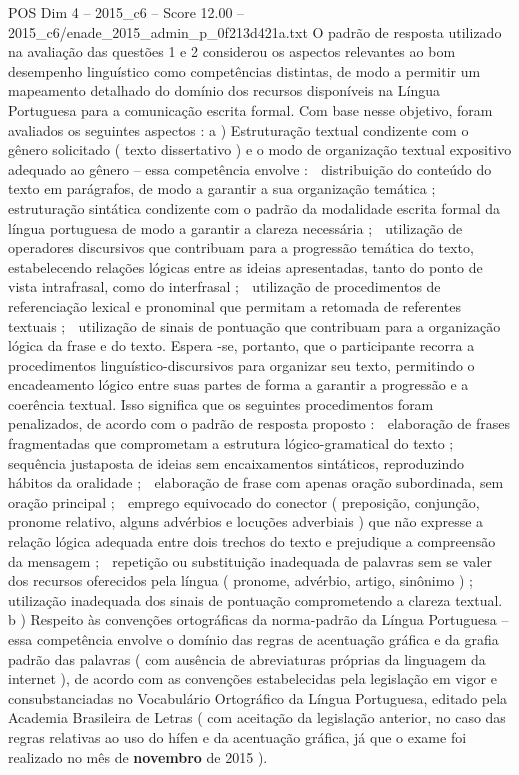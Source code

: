 \begin{textsample}{POS Dim 4 – 2015\_c6 – Score 12.00 – 2015\_c6/enade\_2015\_admin\_p\_0f213d421a.txt}
O padrão de resposta utilizado na avaliação das questões 1 e 2 considerou os aspectos relevantes ao bom desempenho linguístico como competências distintas, de modo a permitir um mapeamento detalhado do domínio dos recursos disponíveis na Língua Portuguesa para a comunicação escrita formal.
Com base nesse objetivo, foram avaliados os seguintes aspectos : a ) Estruturação textual condizente com o gênero solicitado ( texto dissertativo ) e o modo de organização textual expositivo adequado ao gênero – essa competência envolve :  distribuição do conteúdo do texto em parágrafos, de modo a garantir a sua organização temática ;  estruturação sintática condizente com o padrão da modalidade escrita formal da língua portuguesa de modo a garantir a clareza necessária ;  utilização de operadores discursivos que contribuam para a progressão temática do texto, estabelecendo relações lógicas entre as ideias apresentadas, tanto do ponto de vista intrafrasal, como do interfrasal ;  utilização de procedimentos de referenciação lexical e pronominal que permitam a retomada de referentes textuais ;  utilização de sinais de pontuação que contribuam para a organização lógica da frase e do texto.
Espera -se, portanto, que o participante recorra a procedimentos linguístico-discursivos para organizar seu texto, permitindo o encadeamento lógico entre suas partes de forma a garantir a progressão e a coerência textual.
Isso significa que os seguintes procedimentos foram penalizados, de acordo com o padrão de resposta proposto :  elaboração de frases fragmentadas que comprometam a estrutura lógico-gramatical do texto ;  sequência justaposta de ideias sem encaixamentos sintáticos, reproduzindo hábitos da oralidade ;  elaboração de frase com apenas oração subordinada, sem oração principal ;  emprego equivocado do conector ( preposição, conjunção, pronome relativo, alguns advérbios e locuções adverbiais ) que não expresse a relação lógica adequada entre dois trechos do texto e prejudique a compreensão da mensagem ;  repetição ou substituição inadequada de palavras sem se valer dos recursos oferecidos pela língua ( pronome, advérbio, artigo, sinônimo ) ;  utilização inadequada dos sinais de pontuação comprometendo a clareza textual. b ) Respeito às convenções ortográficas da norma-padrão da Língua Portuguesa – essa competência envolve o domínio das regras de acentuação gráfica e da grafia padrão das palavras ( com ausência de abreviaturas próprias da linguagem da internet ), de acordo com as convenções estabelecidas pela legislação em vigor e consubstanciadas no Vocabulário Ortográfico da Língua Portuguesa, editado pela Academia Brasileira de Letras ( com aceitação da legislação anterior, no caso das regras relativas ao uso do hífen e da acentuação gráfica, já que o exame foi realizado no mês de \textbf{novembro} de 2015 ).

\end{textsample}
